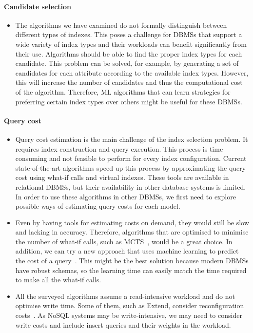 \paragraph{Candidate selection}
\begin{itemize}
    \item The algorithms we have examined do not formally distinguish between different types of indexes. This poses a challenge for DBMSs that support a wide variety of index types and their workloads can benefit significantly from their use. Algorithms should be able to find the proper index types for each candidate. This problem can be solved, for example, by generating a set of candidates for each attribute according to the available index types. However, this will increase the number of candidates and thus the computational cost of the algorithm. Therefore, ML algorithms that can learn strategies for preferring certain index types over others might be useful for these DBMSs.
\end{itemize}

\paragraph{Query cost}
\begin{itemize}
    \item Query cost estimation is the main challenge of the index selection problem. It requires index construction and query execution. This process is time consuming and not feasible to perform for every index configuration. Current state-of-the-art algorithms speed up this process by approximating the query cost using what-if calls and virtual indexes. These tools are available in relational DBMSs, but their availability in other database systems is limited. In order to use these algorithms in other DBMSs, we first need to explore possible ways of estimating query costs for each model.
    
    \item Even by having tools for estimating costs on demand, they would still be slow and lacking in accuracy. Therefore, algorithms that are optimised to minimise the number of what-if calls, such as MCTS~\citep{MCTS}, would be a great choice. In addition, we can try a new approach that uses machine learning to predict the cost of a query~\citep{MLCost}. This might be the best solution because modern DBMSs have robust schemas, so the learning time can easily match the time required to make all the what-if calls.
    
    \item All the surveyed algorithms assume a read-intensive workload and do not optimise write time. Some of them, such as Extend, consider reconfiguration costs~\citep{Extend}. As NoSQL systems may be write-intensive, we may need to consider write costs and include insert queries and their weights in the workload.
\end{itemize}

